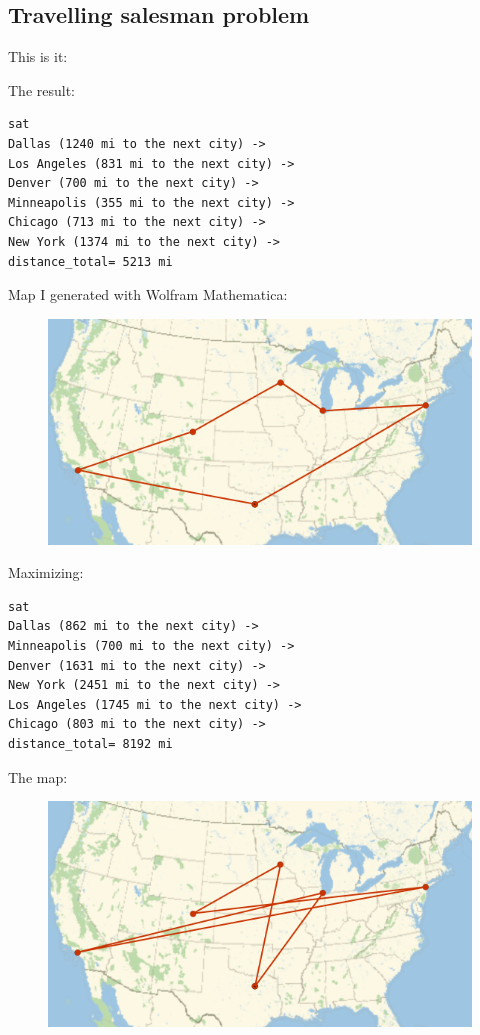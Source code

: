 \subsection{Travelling salesman problem}

This is it:



The result:

\begin{lstlisting}
sat
Dallas (1240 mi to the next city) ->
Los Angeles (831 mi to the next city) ->
Denver (700 mi to the next city) ->
Minneapolis (355 mi to the next city) ->
Chicago (713 mi to the next city) ->
New York (1374 mi to the next city) ->
distance_total= 5213 mi
\end{lstlisting}

Map I generated with Wolfram Mathematica:

\begin{figure}[H]
\centering
\includegraphics[scale=0.6]{SMT/TSP/map1.png}
\caption{}
\end{figure}

Maximizing:

\begin{lstlisting}
sat
Dallas (862 mi to the next city) ->
Minneapolis (700 mi to the next city) ->
Denver (1631 mi to the next city) ->
New York (2451 mi to the next city) ->
Los Angeles (1745 mi to the next city) ->
Chicago (803 mi to the next city) ->
distance_total= 8192 mi
\end{lstlisting}

The map:

\begin{figure}[H]
\centering
\includegraphics[scale=0.6]{SMT/TSP/map2.png}
\caption{}
\end{figure}

